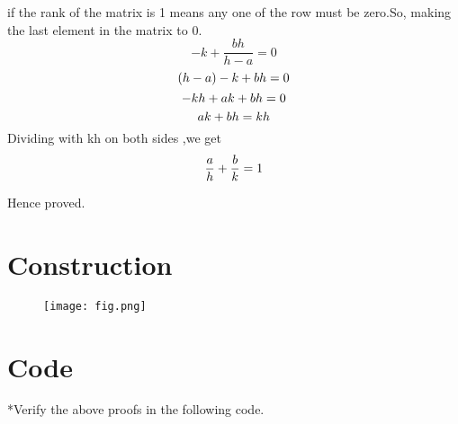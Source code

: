 \documentclass[10pt, a4paper]{article}
\begin{document}
if the rank of the matrix is 1 means any one of the row must be zero.So, making the last element in the matrix to 0.\\
\begin{equation}\label{eq:}
-k+\frac{bh}{h-a}=0
\end{equation} 
\begin{equation}\label{eq:}
(h-a)-k+bh=0\\
\end{equation} 
\begin{equation}\label{eq:}
-kh+ak+bh=0\\
\end{equation} 
\begin{equation}\label{eq:}
ak+bh=kh\\
\end{equation} 
Dividing  with kh on both sides ,we get\\

\begin{equation}\label{eq:}
\frac{a}{h}+\frac{b}{k}=1 \\
\end{equation} 

Hence proved.\\
\section{Construction}
 \begin{figure}[h]
\centering
\texttt{[image: fig.png]} 
\caption{}
\end{figure}
\section{Code}
*Verify the above proofs in the following code.\\

\end{document}

